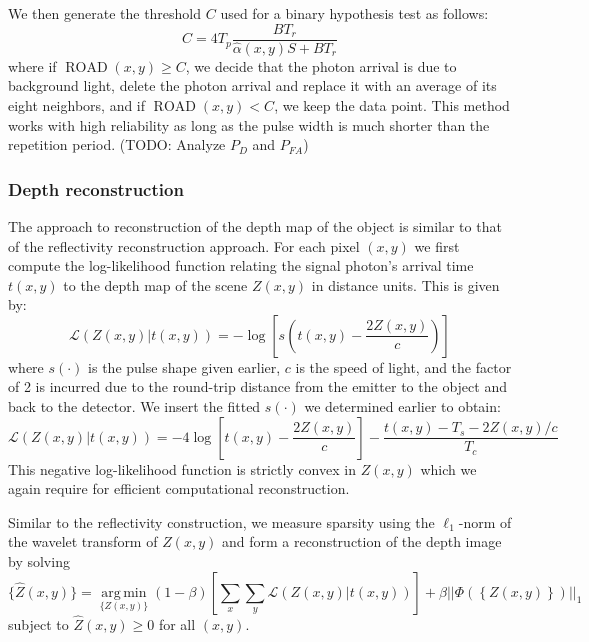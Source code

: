 We then generate the threshold $C$ used for a binary hypothesis test as follows:
\begin{equation}
C = 4T_p \frac{ BT_r }{\hat{\alpha}(x,y)S + BT_r}
\end{equation}
where if $\operatorname{ROAD}(x,y) \geq C$, we decide that the photon arrival is due to background light, delete the photon arrival and replace it with an average of its eight neighbors, and if $\operatorname{ROAD}(x,y) < C$, we keep the data point. This method works with high reliability \cite{garnett-universal} as long as the pulse width is much shorter than the repetition period. (TODO: Analyze $P_D$ and $P_{FA}$)

\subsubsection{Depth reconstruction}
The approach to reconstruction of the depth map of the object is similar to that of the reflectivity reconstruction approach. For each pixel $(x,y)$ we first compute the log-likelihood function relating the signal photon's arrival time $t(x,y)$ to the depth map of the scene $Z(x,y)$ in distance units. This is given by:
\begin{equation}
\mathcal{L}(Z(x,y) | t(x,y)) = -\log\left[ s(t(x,y) - \frac{2Z(x,y)}{c}) \right]
\end{equation}
where $s(\cdot)$ is the pulse shape given earlier, $c$ is the speed of light, and the factor of 2 is incurred due to the round-trip distance from the emitter to the object and back to the detector. We insert the fitted $s(\cdot)$ we determined earlier to obtain:
\begin{equation}
\mathcal{L}(Z(x,y) | t(x,y)) = -4\log\left[ t(x,y) - \frac{2Z(x,y)}{c} \right] - \frac{t(x,y) - T_s - 2Z(x,y)/c}{T_c}
\end{equation}
This negative log-likelihood function is strictly convex in $Z(x,y)$ which we again require for efficient computational reconstruction.

Similar to the reflectivity construction, we measure sparsity using the $\ell_1$-norm of the wavelet transform of $Z(x,y)$ and form a reconstruction of the depth image by solving
\begin{equation}
\{ \hat{Z}(x,y) \} = \underset{\{Z(x,y)\}}{\operatorname{arg\,min}} (1 - \beta) \left[ \sum_x \sum_y \mathcal{L}( Z(x,y) | t(x,y) ) \right] + \beta || \Phi\left(\left\{ Z(x,y) \right\}\right) ||_1
\end{equation}
subject to $\hat{Z}(x,y) \geq 0$ for all $(x,y)$.

